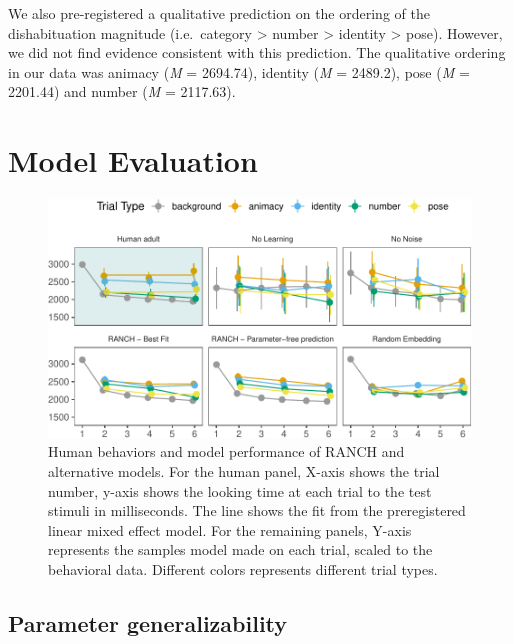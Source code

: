 \documentclass[10pt, letterpaper]{article}
\newenvironment{CodeChunk}{}{}
\begin{document}
We also pre-registered a qualitative prediction on the ordering of the
dishabituation magnitude (i.e.~category \textgreater{} number
\textgreater{} identity \textgreater{} pose). However, we did not find
evidence consistent with this prediction. The qualitative ordering in
our data was animacy (\emph{M} = 2694.74), identity (\emph{M} = 2489.2),
pose (\emph{M} = 2201.44) and number (\emph{M} = 2117.63).

\hypertarget{model-evaluation}{%
\section{Model Evaluation}\label{model-evaluation}}

\begin{CodeChunk}
\begin{figure}[h!]

{\centering \includegraphics{figs/lol-1} 

}

\caption[Human behaviors and model performance of RANCH and alternative models]{Human behaviors and model performance of RANCH and alternative models. For the human panel, X-axis shows the trial number, y-axis shows the looking time at each trial to the test stimuli in milliseconds. The line shows the fit from the preregistered linear mixed effect model. For the remaining panels, Y-axis represents the samples model made on each trial, scaled to the behavioral data. Different colors represents different trial types.}\label{fig:lol}
\end{figure}
\end{CodeChunk}

\hypertarget{parameter-generalizability}{%
\subsection{Parameter
generalizability}\label{parameter-generalizability}}
\end{document}
